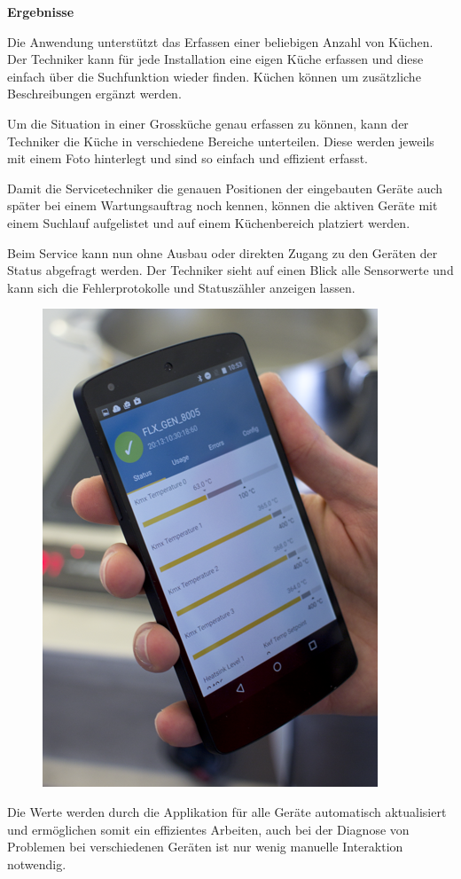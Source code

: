 \textbf{Ergebnisse}

Die Anwendung unterstützt das Erfassen einer beliebigen Anzahl von Küchen. Der Techniker kann für jede Installation eine eigen Küche erfassen und diese einfach über die Suchfunktion wieder finden. Küchen können um zusätzliche Beschreibungen ergänzt werden.

Um die Situation in einer Grossküche genau erfassen zu können, kann der Techniker die Küche in verschiedene Bereiche unterteilen. Diese werden jeweils mit einem Foto hinterlegt und sind so einfach und effizient erfasst.

Damit die Servicetechniker die genauen Positionen der eingebauten Geräte auch später bei einem Wartungsauftrag noch kennen, können die aktiven Geräte mit einem Suchlauf aufgelistet und auf einem Küchenbereich platziert werden.
\WFclear

Beim Service kann nun ohne Ausbau oder direkten Zugang zu den Geräten der Status abgefragt werden. Der Techniker sieht auf einen Blick alle Sensorwerte und kann sich die Fehlerprotokolle und Statuszähler anzeigen lassen.\\
\begin{figure}
	\vspace{-.5cm}
	\begin{center}
		\includegraphics[scale=1]{start/img/img_7610}
	\end{center}
	\vspace{-1cm}
\end{figure}
Die Werte werden durch die Applikation für alle Geräte automatisch aktualisiert und ermöglichen somit ein effizientes Arbeiten, auch bei der Diagnose von Problemen bei verschiedenen Geräten ist nur wenig manuelle Interaktion notwendig.

